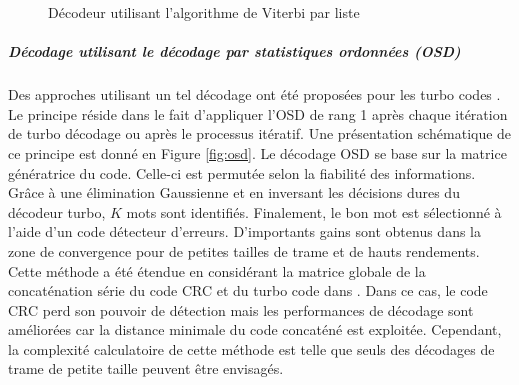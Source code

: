 \begin{figure}[tb]
\begin{center}
{      \label{sub:lva3}}
    \caption{Décodeur utilisant l’algorithme de Viterbi par liste}
    \label{fig:lva}
  \end{center}
\end{figure}

\subparagraph{Décodage utilisant le décodage par statistiques ordonnées (OSD)} Des approches utilisant un tel décodage ont été proposées pour les turbo codes \cite{osdAided}. Le principe réside dans le fait d'appliquer l'OSD \cite{osd} de rang 1 après chaque itération de turbo décodage ou après le processus itératif. Une présentation schématique de ce principe est donné en Figure \ref{fig:osd}. Le décodage OSD se base sur la matrice génératrice du code. Celle-ci est permutée selon la fiabilité des informations. Grâce à une élimination Gaussienne et en inversant les décisions dures du décodeur turbo, $K$ mots sont identifiés. Finalement, le bon mot est sélectionné à l'aide d'un code détecteur d'erreurs. D'importants gains sont obtenus dans la zone de convergence pour de petites tailles de trame et de hauts rendements.  
Cette méthode a été étendue en considérant la matrice globale de la concaténation série du code CRC et du turbo code dans \cite{osdCrcAided}. Dans ce cas, le code CRC perd son pouvoir de détection mais les performances de décodage sont améliorées car la distance minimale du code concaténé est exploitée. Cependant, la complexité calculatoire de cette méthode est telle que seuls des décodages de trame de petite taille peuvent être envisagés.

